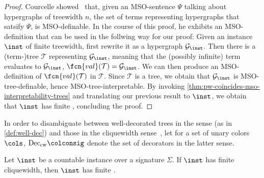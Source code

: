 \begin{proof}
	Courcelle showed~\cite[Theorem 8.1]{Cou89} that, given an MSO-sentence $\Psi$ talking about hypergraphs of treewidth $n$, the set of terms representing hypergraphs that satsify $\Psi$, is MSO-definable. In the course of this proof, he exhibits an MSO-definition that can be used in the follwing way for our proof: Given an instance $\inst$ of finite treewidth, first rewrite it as a hypergraph $\mathcal{G}_{\inst}$. Then there is a (term-)tree $\mathcal{T}$ representing $\mathcal{G}_{\inst}$, meaning that the (possibly infinite) term evaluates to $\mathcal{G}_{\inst}$, $\fcn{val}(\mathcal{T}) = \mathcal{G}_{\inst}$. We can then produce an MSO-definition of $\fcn{val}(\mathcal{T}) $ in $\mathcal{T}$. Since $\mathcal{T}$ is a tree, we obtain that $\mathcal{G}_{\inst}$ is MSO-tree-definable, hence MSO-tree-interpretable. By invoking \cref{thm:pw-coincides-mso-interpretability-trees} and translating our previous result to $\inst$, we obtain that $\inst$ has finite \partitionwidth{}, concluding the proof.
\end{proof}

In order to disambiguate between well-decorated trees in the \partitionwidth{} sense (as in \cref{def:well-dec}) and those in the cliquewidth sense~\cite[Definition 6]{ICDT2023}, let for a set of unary colors $\cols$, $\mathrm{Dec}_{\mathrm{cw}}\colconsig$ denote the set of decorators in the latter sense.

\begin{proposition}\label{prop:cw-implies-pw}
	Let $\inst$ be a countable instance over a signature $\Sigma$.
	If $\inst$ has finite cliquewidth, then $\inst$ has finite \ercwidth{}.
\end{proposition}

